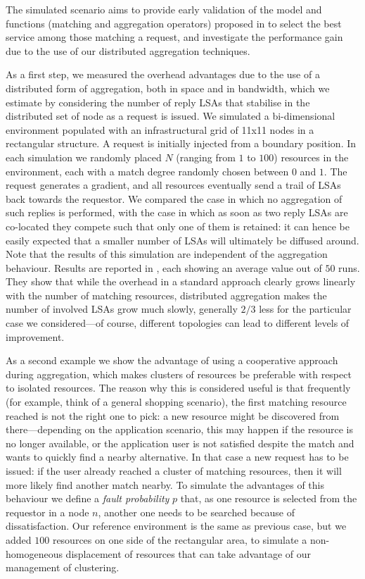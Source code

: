 \documentclass[12pt,a4paper,twoside,openright]{book}
\begin{document}
The simulated scenario aims to provide early validation of the model and functions (matching and aggregation operators) proposed in  to select the best service among those matching a request, and investigate the performance gain due to the use of our distributed aggregation techniques.

As a first step, we measured the overhead advantages due to the use of a distributed form of aggregation, both in space and in bandwidth, which we estimate by considering the number of reply LSAs that stabilise in the distributed set of node as a request is issued.
%
We simulated a bi-dimensional environment populated with an infrastructural grid of 11x11 nodes in a rectangular structure.
%
A request is initially injected from a boundary position.
%
In each simulation we randomly placed $N$ (ranging from $1$ to $100$) resources in the environment, each with a match degree randomly chosen between $0$ and $1$.
%
The request generates a gradient, and all resources eventually send a trail of LSAs back towards the requestor.
%
We compared the case in which no aggregation of such replies is performed, with the case in which as soon as two reply LSAs are co-located they compete such that only one of them is retained: it can hence be easily expected that a smaller number of LSAs will ultimately be diffused around.
%
Note that the results of this simulation are independent of the aggregation behaviour.
%
Results are reported in , each showing an average value out of $50$ runs.
%
They show that while the overhead in a standard approach clearly grows linearly with the number of matching resources, distributed aggregation makes the number of involved LSAs grow much slowly, generally $2/3$ less for the particular case we considered---of course, different topologies can lead to different levels of improvement.

%
As a second example we show the advantage of using a cooperative approach during aggregation, which makes clusters of resources be preferable with respect to isolated resources.
%
The reason why this is considered useful is that frequently (for example, think of a general shopping scenario), the first matching resource reached is not the right one to pick: a new resource might be discovered from there---depending on the application scenario, this may happen if the resource is no longer available, or the application user is not satisfied despite the match and wants to quickly find a nearby alternative.
%
In that case a new request has to be issued: if the user already reached a cluster of matching resources, then it will more likely find another match nearby.
%
To simulate the advantages of this behaviour we define a \emph{fault probability} $p$ that, as one resource is selected from the requestor in a node $n$, another one needs to be searched because of dissatisfaction.
%
Our reference environment is the same as previous case, but we added $100$ resources on one side of the rectangular area, to simulate a non-homogeneous displacement of resources that can take advantage of our management of clustering.
\end{document}
